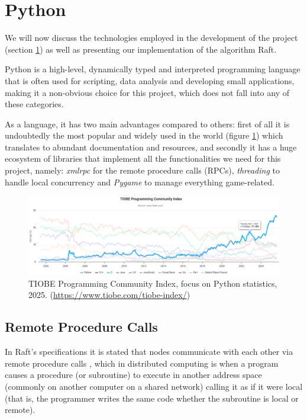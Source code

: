 \section{Python} \label{sec:python}

We will now discuss the technologies employed in the development of the project (section \ref{sec:python}) as well as presenting our implementation of the algorithm Raft.

Python is a high-level, dynamically typed and interpreted programming language that is often used for scripting, data analysis and developing small applications, making it a non-obvious choice for this project, which does not fall into any of these categories.

As a language, it has two main advantages compared to others: first of all it is undoubtedly the most popular and widely used in the world (figure \ref{fig:tiobe}) \cite{tiobe,ieeeSpect} which translates to abundant documentation and resources, and secondly it has a huge ecosystem of libraries that implement all the functionalities we need for this project, namely: \textit{xmlrpc} for the remote procedure calls (RPCs), \textit{threading} to handle local concurrency and \textit{Pygame} to manage everything game-related.

\begin{figure}[h]
  \centering
  \includegraphics[width=\linewidth]{images/TIOBEindex.png}
  \caption{TIOBE Programming Community Index, focus on Python statistics, 2025. (\url{https://www.tiobe.com/tiobe-index/})}
  \label{fig:tiobe}
\end{figure}


\subsection{Remote Procedure Calls} \label{sec:xmlrpc}

In Raft's specifications it is stated that nodes communicate with each other via remote procedure calls \cite{raft}, which in distributed computing is when a program causes a procedure (or subroutine) to execute in another address space (commonly on another computer on a shared network) calling it as if it were local (that is, the programmer writes the same code whether the subroutine is local or remote).

